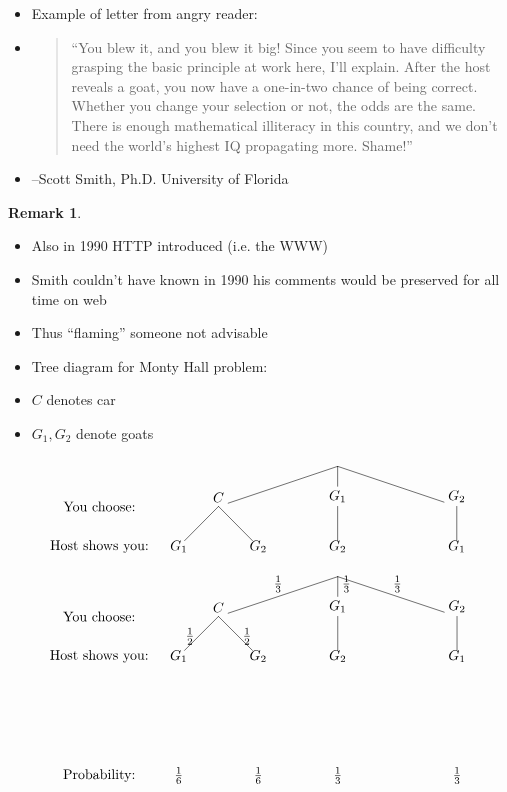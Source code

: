 \documentclass{beamer}
\theoremstyle{definition}
\newtheorem{remark}{Remark}
\begin{document}
\begin{frame}
\begin{itemize}
\item Example of letter from angry reader:
\item\begin{quotation}
``You blew it, and you blew it big! Since you seem to have difficulty
grasping the basic principle at work here, I'll explain. After the
host reveals a goat, you now have a one-in-two chance of being
correct. Whether you change your selection or not, the odds are the
same. There is enough mathematical illiteracy in this country, and
we don't need the world's highest IQ propagating more. Shame!''
\end{quotation}
\item[] --Scott Smith, Ph.D. University of Florida
\end{itemize}
\begin{remark}
\begin{itemize}
\item Also in 1990 HTTP introduced (i.e. the WWW)
\item Smith couldn't have known in 1990 his comments
would be preserved for all time on web
\item Thus ``flaming'' someone not advisable
\end{itemize}
\end{remark}
\end{frame}

\begin{frame}
\begin{itemize}
\item Tree diagram for Monty Hall problem:
\item \alert{$C$} denotes car
\item \alert{$G_1,G_2$} denote goats
\end{itemize}
\[\begin{xy}<1cm,0cm>:
(-6,-1)*{\text{You choose:}};
(-6,-2)*{\text{Host shows you:}};
(0,0)="0";
(-3,-1)="-31";
(0,-1)="01";
(3,-1)="31";
"0";"-31"*+!D{C}**\dir{-};
"0";"01"*+!D{G_1}**\dir{-};
"0";"31"*+!D{G_2}**\dir{-};
"-31";(-4,-2)*{G_1}**\dir{-};
"-31";(-2,-2)*{G_2}**\dir{-};
"01";(0,-2)*{G_2}**\dir{-};
"31";(3,-2)*{G_1}**\dir{-};
\end{xy}\]
\end{frame}

\begin{frame}
\[\begin{xy}<1cm,0cm>:
(-6,-1)*{\text{You choose:}};
(-6,-2)*{\text{Host shows you:}};
(-6,-5)*{\text{Probability:}};
(0,0)="0";
(-3,-1)="-31";
(0,-1)="01";
(3,-1)="31";
"0";"-31"*+!D{C}**\dir{-}?*+!D{\frac{1}{3}};
"0";"01"*+!D{G_1}**\dir{-}?*+!DL{\frac{1}{3}};
"0";"31"*+!D{G_2}**\dir{-}?*+!D{\frac{1}{3}};
"-31";(-4,-2)*{G_1}**\dir{-}?*+!R{\frac{1}{2}};
"-31";(-2,-2)*{G_2}**\dir{-}?*+!L{\frac{1}{2}};
"01";(0,-2)*{G_2}**\dir{-};
"31";(3,-2)*{G_1}**\dir{-};
(-4,-5)*{\frac{1}{6}};(-2,-5)*{\frac{1}{6}};
(0,-5)*{\frac{1}{3}};(3,-5)*{\frac{1}{3}};
\end{xy}\]
\end{frame}
\end{document}
